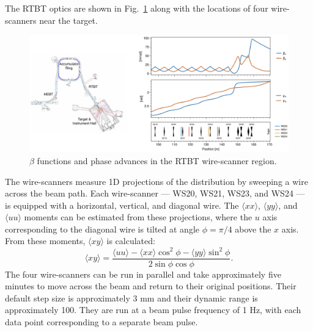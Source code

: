 The RTBT optics are shown in Fig.~\ref{fig:rtbt_optics} along with the locations of four wire-scanners near the target.
%
\begin{figure}[!p]
    \includegraphics[width=\textwidth]{Images/chapter4/RTBT_optics4.png}
    \caption{$\beta$ functions and phase advances in the RTBT wire-scanner region.}
    \label{fig:rtbt_optics}
\end{figure}
%
The wire-scanners measure 1D projections of the distribution by sweeping a wire across the beam path. Each wire-scanner — WS20, WS21, WS23, and WS24 — is equipped with a horizontal, vertical, and diagonal wire. The $\langle{xx}\rangle$, $\langle{yy}\rangle$, and $\langle{uu}\rangle$ moments can be estimated from these projections, where the $u$ axis corresponding to the diagonal wire is tilted at angle $\phi = \pi/4$ above the $x$ axis. From these moments, $\langle{xy}\rangle$ is calculated:
%
\begin{equation}
    \langle{xy}\rangle = \frac{\langle{uu}\rangle - \langle{xx}\rangle \cos^2\phi - \langle{yy}\rangle \sin^2\phi}{2\sin\phi\cos\phi}
    .
\end{equation}
%
The four wire-scanners can be run in parallel and take approximately five minutes to move across the beam and return to their original positions. Their default step size is approximately 3 mm and their dynamic range is approximately 100. They are run at a beam pulse frequency of 1 Hz, with each data point corresponding to a separate beam pulse. 

